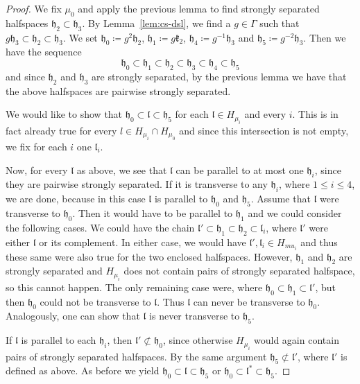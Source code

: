\begin{proof}
  We fix \(\mu_0\) and apply the previous lemma to find strongly separated halfspaces \(\mathfrak{h_2} \subset \mathfrak{h_3}\). By Lemma~\ref{lem:cs-dsl}, we find a \(g \in \Gamma\) such that \(g\mathfrak{h}_3 \subset \mathfrak{h}_2 \subset \mathfrak{h}_3\). We set \(\mathfrak{h}_0 \coloneqq g^2 \mathfrak{h}_2\), \(\mathfrak{h}_1 \coloneqq g\mathfrak{k}_2\), \(\mathfrak{h}_4 \coloneqq g^{-1}\mathfrak{h}_3\) and \(\mathfrak{h}_5 \coloneqq g^{-2} \mathfrak{h}_3\). Then we have the sequence
  \[
    \mathfrak{h}_0 \subset \mathfrak{h}_1 \subset \mathfrak{h}_2 \subset \mathfrak{h}_3 \subset \mathfrak{h}_4 \subset \mathfrak{h}_5
  \]
  and since \(\mathfrak{h}_2\) and \(\mathfrak{h}_3\) are strongly separated, by the previous lemma we have that the above halfspaces are pairwise strongly separated.

  We would like to show that \(\mathfrak{h}_0 \subset \mathfrak{l} \subset \mathfrak{h}_5\) for each \(\mathfrak{l} \in H_{\mu_i}\) and every \(i\). This is in fact already true for every \(l \in H_{\mu_i} \cap H_{\mu_0}\) and since this intersection is not empty, we fix for each \(i\) one \(\mathfrak{l}_i\).

  Now, for every \(\mathfrak{l}\) as above, we see that \(\mathfrak{l}\) can be parallel to at most one \(\mathfrak{h}_i\), since they are pairwise strongly separated. If it is transverse to any \(\mathfrak{h}_i\), where \(1 \leq i \leq 4\), we are done, because in this case \(\mathfrak{l}\) is parallel to \(\mathfrak{h}_0\) and \(\mathfrak{h}_5\). Assume that \(\mathfrak{l}\) were transverse to \(\mathfrak{h}_0\). Then it would have to be parallel to \(\mathfrak{h}_1\) and we could consider the following cases. We could have the chain \(\mathfrak{l}' \subset \mathfrak{h}_1 \subset \mathfrak{h}_2 \subset \mathfrak{l}_i\), where \(\mathfrak{l}'\) were either \(\mathfrak{l}\) or its complement. In either case, we would have \(\mathfrak{l}', \mathfrak{l}_i \in H_{mu_i}\) and thus these same were also true for the two enclosed halfspaces. However, \(\mathfrak{h}_1\) and \(\mathfrak{h}_2\) are strongly separated and \(H_{\mu_i}\) does not contain pairs of strongly separated halfspace, so this cannot happen. The only remaining case were, where \(\mathfrak{h_0} \subset \mathfrak{h}_1 \subset \mathfrak{l}'\), but then \(\mathfrak{h}_0\) could not be transverse to \(\mathfrak{l}\). Thus \(\mathfrak{l}\) can never be transverse to \(\mathfrak{h}_0\). Analogously, one can show that \(\mathfrak{l}\) is never transverse to \(\mathfrak{h}_5\).

  If \(\mathfrak{l}\) is parallel to each \(\mathfrak{h}_i\), then \(\mathfrak{l}' \not\subset \mathfrak{h_0}\), since otherwise \(H_{\mu_i}\) would again contain pairs of strongly separated halfspaces. By the same argument \(\mathfrak{h}_5 \not\subset \mathfrak{l}'\), where \(\mathfrak{l}'\) is defined as above. As before we yield \(\mathfrak{h}_0 \subset \mathfrak{l} \subset \mathfrak{h}_5\) or \(\mathfrak{h}_0 \subset \mathfrak{l}^\ast \subset \mathfrak{h}_5\).
\end{proof}

